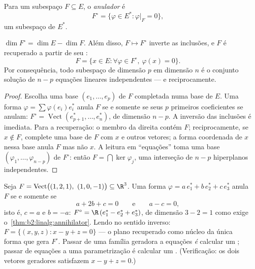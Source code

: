 \begin{definition}[Anulador]\label{def:b2:linalg:annihilator}
Para um subespaço $F \subseteq E$, o
\emph{anulador} é
\[
F^{\circ} = \{\varphi \in E^* : \varphi|_F = 0\},
\]
um subespaço de $E^*$.
\end{definition}

\begin{theorem}\label{thm:b2:linalg:annihilator}
$\dim F^{\circ} = \dim E - \dim F$. Além disso, $F \mapsto F^\circ$
inverte as inclusões, e $F$ é recuperado a partir de seu :
\[
F = \{x \in E : \forall\varphi \in F^\circ,\ \varphi(x) = 0\}.
\]
Por consequência, todo subespaço de dimensão $p$ em dimensão $n$ é o
conjunto solução de $n - p$ equações lineares independentes --- e
reciprocamente.
\end{theorem}

\begin{proof}
Escolha uma base $(e_1, \dots, e_p)$ de $F$ completada numa base de
$E$. Uma forma $\varphi = \sum \varphi(e_i) e_i^*$ anula $F$ se e somente se
seus $p$ primeiros coeficientes se anulam: $F^\circ =
\operatorname{Vect}(e_{p+1}^*, \dots, e_n^*)$, de dimensão $n - p$.
A inversão das inclusões é imediata. Para a recuperação: o membro da direita
contém $F$; reciprocamente, se $x \notin F$, complete uma base de
$F$ com $x$ e outros vetores; a forma coordenada de $x$ nessa
base anula $F$ mas não $x$. A leitura em ``equações'' toma uma
base $(\varphi_1, \dots, \varphi_{n-p})$ de $F^\circ$: então $F =
\bigcap \ker\varphi_j$, uma interseção de $n - p$ hiperplanos
independentes.
\end{proof}

\begin{example}\label{ex:b2:linalg:annihilatorwork}
Seja $F = \operatorname{Vect}\bigl((1, 2, 1),\ (1, 0, -1)\bigr)
\subseteq \R^3$. Uma forma $\varphi = a\,e_1^* + b\,e_2^* + c\,e_3^*$
anula $F$ se e somente se
\[
a + 2b + c = 0
\qquad\text{e}\qquad
a - c = 0 ,
\]
isto é, $c = a$ e $b = -a$: $F^\circ = \R\,(e_1^* - e_2^* +
e_3^*)$, de dimensão $3 - 2 = 1$ como
exige o~\cref{thm:b2:linalg:annihilator}. Lendo no sentido inverso:
$F = \{(x, y, z) : x - y + z = 0\}$ --- o plano recuperado como
núcleo da única forma que gera $F^\circ$. Passar de uma
família geradora a equações \emph{é} calcular um ;
passar de equações a uma parametrização é calcular um
. (Verificação: os dois vetores geradores satisfazem $x - y +
z = 0$.)
\end{example}

